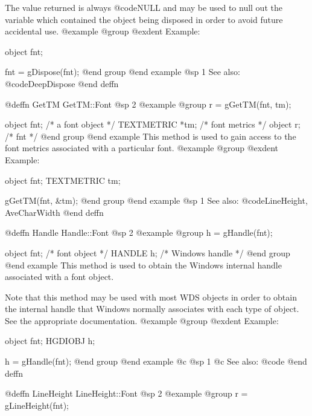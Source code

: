 The value returned is always @code{NULL} and may be used to null out
the variable which contained the object being disposed in order to
avoid future accidental use.
@example
@group
@exdent Example:

object  fnt;

fnt = gDispose(fnt);
@end group
@end example
@sp 1
See also:  @code{DeepDispose}
@end deffn










@deffn {GetTM} GetTM::Font
@sp 2
@example
@group
r = gGetTM(fnt, tm);

object      fnt;  /*  a font object  */
TEXTMETRIC  *tm;  /*  font metrics   */
object      r;    /*  fnt            */
@end group
@end example
This method is used to gain access to the font metrics associated with
a particular font.
@example
@group
@exdent Example:

object  fnt;
TEXTMETRIC  tm;

gGetTM(fnt, &tm);
@end group
@end example
@sp 1
See also:  @code{LineHeight, AveCharWidth}
@end deffn













@deffn {Handle} Handle::Font
@sp 2
@example
@group
h = gHandle(fnt);

object  fnt;    /*  font object     */
HANDLE  h;      /*  Windows handle  */
@end group
@end example
This method is used to obtain the Windows internal handle associated with
a font object.  

Note that this method may be used with most WDS objects in order to obtain
the internal handle that Windows normally associates with each type of object.
See the appropriate documentation.
@example
@group
@exdent Example:

object  fnt;
HGDIOBJ h;

h = gHandle(fnt);
@end group
@end example
@c @sp 1
@c See also:  @code{}
@end deffn














@deffn {LineHeight} LineHeight::Font
@sp 2
@example
@group
r = gLineHeight(fnt);

